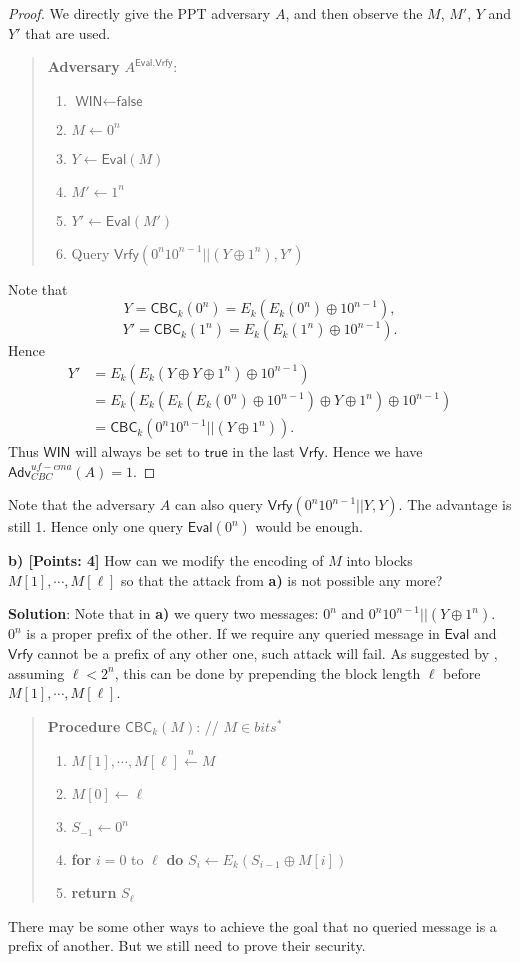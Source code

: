 \documentclass[12pt]{article}
\newcommand{\getsn}{\stackrel{n}{\gets}}
\newcommand{\Adv}{\textsf{Adv}}
\newcommand{\CBC}{\textsf{CBC}}
\newcommand{\Eval}{\textsf{Eval}}
\newcommand{\Vrfy}{\textsf{Vrfy}}
\newcommand{\WIN}{\textsf{WIN}}
\newcommand{\true}{\textsf{true}}
\newcommand{\false}{\textsf{false}}
\theoremstyle{definition}
\begin{document}
\begin{proof}
We directly give the PPT adversary $A$, and then observe the $M$, $M'$, $Y$ and $Y'$ that are used.
\begin{quote}
{\bf Adversary} $A^{\Eval, \Vrfy}$:
\begin{enumerate}
\item $\WIN \gets \false$
\item $M \gets 0^n$
\item $Y \gets \Eval(M)$
\item $M' \gets 1^n$
\item $Y' \gets \Eval(M')$
\item Query $\Vrfy(0^n10^{n-1}||(Y \oplus 1^n), Y')$
\end{enumerate}
\end{quote}
Note that 
$$Y = \CBC_k (0^n) = E_k(E_k(0^n) \oplus 10^{n-1}),$$
$$Y' = \CBC_k (1^n) = E_k(E_k(1^n) \oplus 10^{n-1}).$$
Hence
$$\begin{aligned}
Y' &= E_k(E_k(Y \oplus Y \oplus 1^n) \oplus 10^{n-1}) \\
&= E_k(E_k(E_k(E_k(0^n) \oplus 10^{n-1}) \oplus Y \oplus 1^n) \oplus 10^{n-1}) \\
&= \CBC_k (0^n10^{n-1} || (Y \oplus 1^n)).
\end{aligned}$$
Thus $\WIN$ will always be set to $\true$ in the last $\Vrfy$. Hence we have $\Adv_{CBC}^{uf-cma}(A) = 1$.
\end{proof}
Note that the adversary $A$ can also query $\Vrfy(0^n10^{n-1}||Y, Y)$. The advantage is still 1. Hence only one query $\Eval(0^n)$ would be enough.

{\bf b) [Points: 4]} How can we modify the encoding of $M$ into blocks
$M[1], \cdots, M[\ell]$ so that the attack from {\bf a)} is not possible any more?

{\bf Solution}: Note that in {\bf a)} we query two messages: $0^n$ and $0^n10^{n-1}||(Y \oplus 1^n)$. $0^n$ is a proper prefix of the other. If we require any queried message in $\Eval$ and $\Vrfy$ cannot be a prefix of any other one, such attack will fail. As suggested by \cite{BKR94}, assuming $\ell < 2^n$, this can be done by prepending the block length $\ell$ before $M[1], \cdots, M[\ell]$.
\begin{quote}
{\bf Procedure} $\CBC_k (M)$: // $M \in bits^*$
\begin{enumerate}
\item $M[1], \cdots, M[\ell] \getsn M$
\item $M[0] \gets \ell$
\item $S_{-1} \gets 0^n$
\item {\bf for} $i=0$ to $\ell$ {\bf do} $S_i \gets E_k (S_{i-1} \oplus M[i])$
\item {\bf return} $S_{\ell}$
\end{enumerate}
\end{quote}
There may be some other ways to achieve the goal that no queried message is a prefix of another. But we still need to prove their security.
\end{document}
